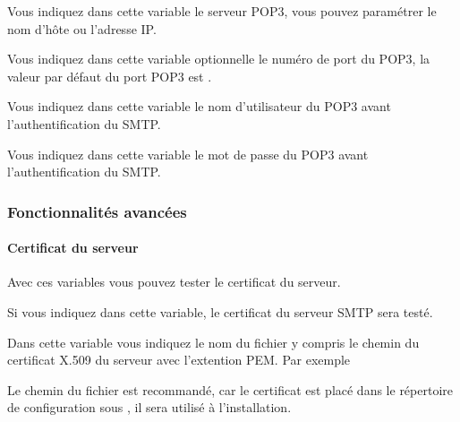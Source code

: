 \begin {description}

    Vous indiquez dans cette variable le serveur POP3, vous pouvez paramétrer
	le nom d'hôte ou l'adresse IP.


    Vous indiquez dans cette variable optionnelle le numéro de port du POP3,
	la valeur par défaut du port POP3 est .


    Vous indiquez dans cette variable le nom d'utilisateur du POP3 avant
	l'authentification du SMTP.


    Vous indiquez dans cette variable le mot de passe du POP3 avant
	l'authentification du SMTP.

\end {description}

\subsubsection {Fonctionnalités avancées}

\paragraph {Certificat du serveur}

	Avec ces variables vous pouvez tester le certificat du serveur.

\begin {description}


    Si vous indiquez  dans cette variable, le certificat 
	du serveur SMTP sera testé.


    Dans cette variable vous indiquez le nom du fichier y compris le chemin du
	certificat X.509 du serveur avec l'extention PEM. Par exemple

    Le chemin du fichier  est recommandé,
	car le certificat est placé dans le répertoire de configuration sous
	, il sera utilisé à l'installation.

\end {description}

